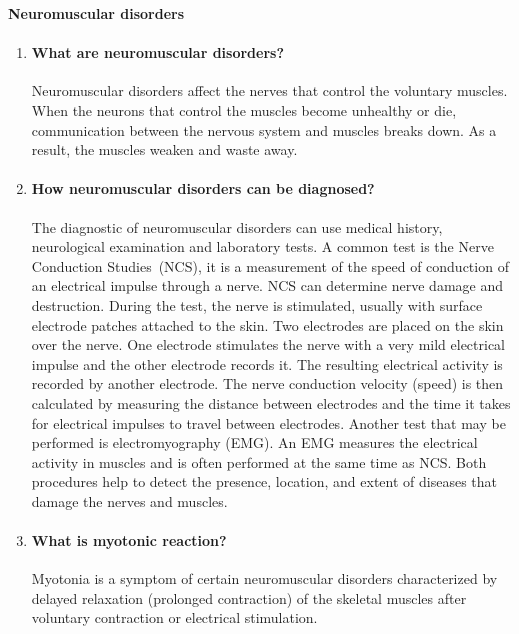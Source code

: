 \documentclass[12pt,article,oneside,a4paper]{memoir}
\begin{document}
\textbf{Neuromuscular disorders}\\
\begin{enumerate}
\item \paragraph{What are neuromuscular disorders?}
Neuromuscular disorders affect the nerves that control the voluntary muscles.
When the neurons that control the muscles become unhealthy or die,
communication between the nervous system and muscles breaks down. As a result,
the muscles weaken and waste away.

\item \paragraph{How neuromuscular disorders can be diagnosed?}
The diagnostic of neuromuscular disorders can use medical history, neurological
examination and laboratory tests.
A common test is the Nerve Conduction Studies~(NCS), it is a measurement of the
speed of conduction of an electrical impulse through a nerve. NCS can determine
nerve damage and destruction.
During the test, the nerve is stimulated, usually with surface electrode
patches attached to the skin. Two electrodes are placed on the skin over the
nerve. One electrode stimulates the nerve with a very mild electrical impulse
and the other electrode records it. The resulting electrical activity is
recorded by another electrode. The nerve conduction velocity (speed) is then
calculated by measuring the distance between electrodes and the time it takes
for electrical impulses to travel between electrodes.
Another test that may be performed is electromyography (EMG). An EMG measures
the electrical activity in muscles and is often performed at the same time as
NCS. Both procedures help to detect the presence, location, and extent of
diseases that damage the nerves and muscles.

\item \paragraph{What is myotonic reaction?}
Myotonia is a symptom of certain neuromuscular disorders characterized by
delayed relaxation (prolonged contraction) of the skeletal muscles after
voluntary contraction or electrical stimulation.
\end{enumerate}
\end{document}
